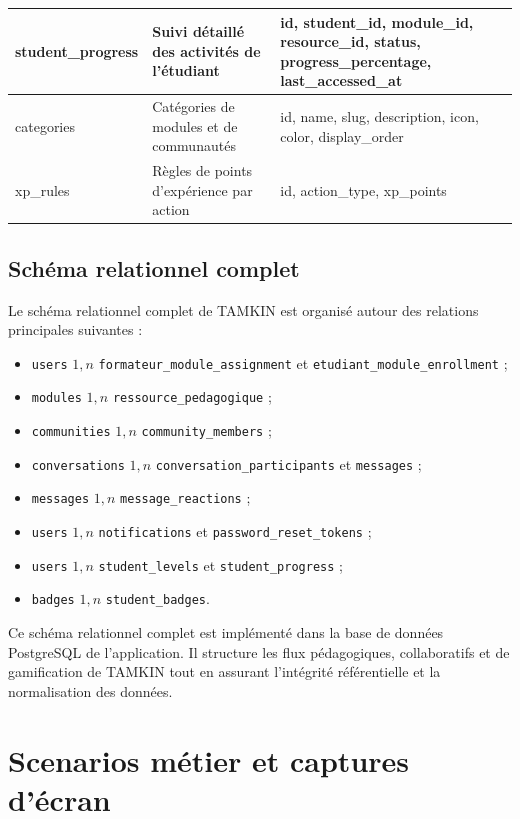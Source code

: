 \documentclass[12pt,a4paper,oneside]{report}
\begin{document}
\begin{longtable}{|p{3.4cm}|p{4.4cm}|p{4.4cm}|}
\hline
student\_progress & Suivi détaillé des activités de l'étudiant & id, student\_id, module\_id, resource\_id, status, progress\_percentage, last\_accessed\_at \\
\hline
categories & Catégories de modules et de communautés & id, name, slug, description, icon, color, display\_order \\
\hline
xp\_rules & Règles de points d'expérience par action & id, action\_type, xp\_points \\
\hline
\end{longtable}

\subsection{Schéma relationnel complet}

Le schéma relationnel complet de TAMKIN est organisé autour des relations principales suivantes :
\begin{itemize}
  \item \texttt{users} \(1,n\) \texttt{formateur\_module\_assignment} et \texttt{etudiant\_module\_enrollment} ;
  \item \texttt{modules} \(1,n\) \texttt{ressource\_pedagogique} ;
  \item \texttt{communities} \(1,n\) \texttt{community\_members} ;
  \item \texttt{conversations} \(1,n\) \texttt{conversation\_participants} et \texttt{messages} ;
  \item \texttt{messages} \(1,n\) \texttt{message\_reactions} ;
  \item \texttt{users} \(1,n\) \texttt{notifications} et \texttt{password\_reset\_tokens} ;
  \item \texttt{users} \(1,n\) \texttt{student\_levels} et \texttt{student\_progress} ;
  \item \texttt{badges} \(1,n\) \texttt{student\_badges}.
\end{itemize}

Ce schéma relationnel complet est implémenté dans la base de données PostgreSQL de l'application. Il structure les flux pédagogiques, collaboratifs et de gamification de TAMKIN tout en assurant l'intégrité référentielle et la normalisation des données.

\section{Scenarios métier et captures d’écran}
\end{document}
